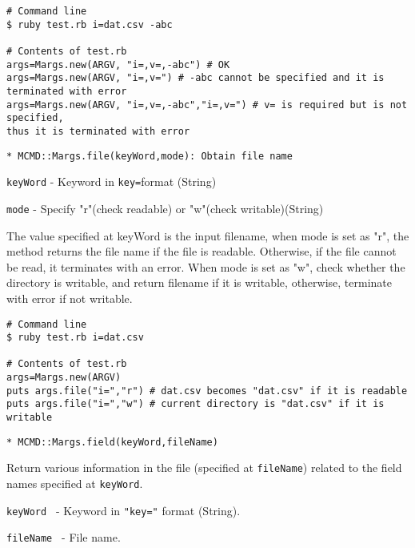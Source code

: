 \begin{Verbatim}[baselinestretch=0.7,frame=single]
# Command line
$ ruby test.rb i=dat.csv -abc

# Contents of test.rb
args=Margs.new(ARGV, "i=,v=,-abc") # OK
args=Margs.new(ARGV, "i=,v=") # -abc cannot be specified and it is terminated with error
args=Margs.new(ARGV, "i=,v=,-abc","i=,v=") # v= is required but is not specified, 
thus it is terminated with error
\end{Verbatim}

{\Large
\begin{verbatim}
* MCMD::Margs.file(keyWord,mode): Obtain file name 
\end{verbatim}
}
\begin{description}
	\setlength{\itemindent}{-5mm}
	\item {\large \verb/keyWord/} - Keyword in \verb/key=/format (String)
	\item {\large \verb/mode/} - Specify "r"(check readable) or "w"(check writable)(String)
\end{description}

The value specified at keyWord is the input filename, when mode is set as "r", the method returns the file name if the file is readable. Otherwise, if the file cannot be read, it terminates with an error. When mode is set as "w", check whether the directory is writable, and return filename if it is writable, otherwise, terminate with error if not writable. 


\begin{Verbatim}[baselinestretch=0.7,frame=single]
# Command line
$ ruby test.rb i=dat.csv

# Contents of test.rb
args=Margs.new(ARGV)
puts args.file("i=","r") # dat.csv becomes "dat.csv" if it is readable
puts args.file("i=","w") # current directory is "dat.csv" if it is writable 
\end{Verbatim}

{\Large
\begin{verbatim}
* MCMD::Margs.field(keyWord,fileName)
\end{verbatim}
}
Return various information in the file (specified at \verb/fileName/) related to the field names specified at \verb/keyWord/. 


\begin{description}
	\setlength{\itemindent}{-5mm}
	\item {\large \verb/keyWord /} - Keyword in \verb/"key="/ format (String).
	\item {\large \verb/fileName /} - File name.
\end{description}


